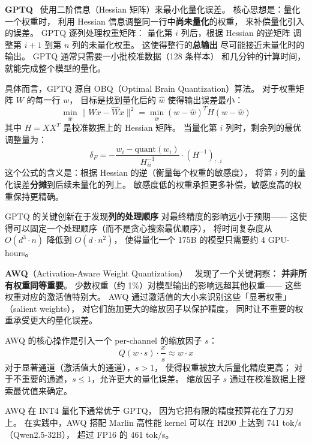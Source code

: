 \textbf{GPTQ}~\cite{frantar2022gptq} 使用二阶信息（Hessian 矩阵）来最小化量化误差。
核心思想是：量化一个权重时，
利用 Hessian 信息调整同一行中\textbf{尚未量化}的权重，
来补偿量化引入的误差。
GPTQ 逐列处理权重矩阵：
量化第 $i$ 列后，根据 Hessian 的逆矩阵
调整第 $i+1$ 到第 $n$ 列的未量化权重。
这使得整行的\textbf{总输出}
尽可能接近未量化时的输出。
GPTQ 通常只需要一小批校准数据（128 条样本）
和几分钟的计算时间，就能完成整个模型的量化。

具体而言，GPTQ 源自 OBQ（Optimal Brain Quantization）算法。
对于权重矩阵 $W$ 的每一行 $w$，
目标是找到量化后的 $\hat{w}$ 使得输出误差最小：
\begin{equation}
  \min_{\hat{w}} \| W x - \hat{W} x \|^2
  = \min_{\hat{w}} (w - \hat{w})^T H (w - \hat{w})
\end{equation}
其中 $H = X X^T$ 是校准数据上的 Hessian 矩阵。
当量化第 $i$ 列时，剩余列的最优调整量为：
\begin{equation}
  \delta_F = -\frac{w_i - \mathrm{quant}(w_i)}{H_{ii}^{-1}} \cdot (H^{-1})_{:,i}
\end{equation}
这个公式的含义是：根据 Hessian 的逆（衡量每个权重的敏感度），
将第 $i$ 列的量化误差\textbf{分摊}到后续未量化的列上。
敏感度低的权重承担更多补偿，敏感度高的权重保持更精确。

GPTQ 的关键创新在于发现\textbf{列的处理顺序}
对最终精度的影响远小于预期——
这使得可以固定一个处理顺序（而不是贪心搜索最优顺序），
将时间复杂度从 $O(d^3 \cdot n)$ 降低到 $O(d \cdot n^2)$，
使得量化一个 175B 的模型只需要约 4 GPU-hours。

\textbf{AWQ}（Activation-Aware Weight Quantization）~\cite{lin2024awq}
发现了一个关键洞察：
\textbf{并非所有权重同等重要}。
少数权重（约 1\%）对模型输出的影响远超其他权重——
这些权重对应的激活值特别大。
AWQ 通过激活值的大小来识别这些「显著权重」（salient weights），
对它们施加更大的缩放因子以保护精度，
同时让不重要的权重承受更大的量化误差。

AWQ 的核心操作是引入一个 per-channel 的缩放因子 $s$：
\begin{equation}
  Q(w \cdot s) \cdot \frac{x}{s} \approx w \cdot x
\end{equation}
对于显著通道（激活值大的通道），$s > 1$，
使得权重被放大后量化精度更高；
对于不重要的通道，$s \leq 1$，允许更大的量化误差。
缩放因子 $s$ 通过在校准数据上搜索最优值来确定。

AWQ 在 INT4 量化下通常优于 GPTQ，
因为它把有限的精度预算花在了刀刃上。
在实践中，AWQ 搭配 Marlin 高性能 kernel
可以在 H200 上达到 741 tok/s（Qwen2.5-32B），
超过 FP16 的 461 tok/s。

